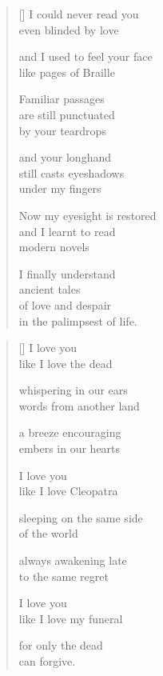 \documentclass[14pt]{extbook}
\newcommand*{\centeredornament}{\centerline{\pgfornament[width=6cm]{88}}}
\begin{document}
\newpage

\vspace*{-15mm}
\centeredornament
\vspace*{-7mm}


\settowidth{\versewidth}{Now my eyesight is restored}

\begin{verse}[\versewidth]
  I could never read you \\
  even blinded by love

  and I used to feel your face \\
  like pages of Braille

  Familiar passages \\
  are still punctuated \\
  by your teardrops

  and your longhand \\
  still casts eyeshadows \\
  under my fingers

  Now my eyesight is restored \\
  and I learnt to read \\
  modern novels

  I finally understand \\
  ancient tales \\
  of love and despair \\
  in the palimpsest of life.
\end{verse}


\newpage

\vspace*{-15mm}
\centeredornament
\vspace*{-7mm}


\settowidth{\versewidth}{sleeping on the same side}

\begin{verse}[\versewidth]
  I love you \\
  like I love the dead

  whispering in our ears \\
  words from another land

  a breeze encouraging \\
  embers in our hearts

  I love you \\
  like I love Cleopatra

  sleeping on the same side \\
  of the world

  always awakening late \\
  to the same regret

  I love you \\
  like I love my funeral

  for only the dead \\
  can forgive.
\end{verse}
\end{document}

